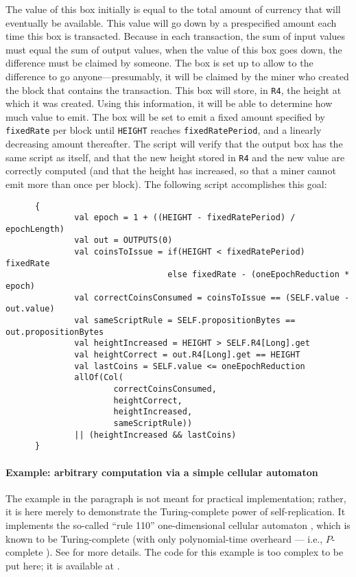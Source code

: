 \documentclass[11pt]{article}
\newcommand{\authnote}[2]{\marginpar{\parbox{\marginparwidth}{\tiny %
  \textsf{#1 {\textcolor{blue}{notes: #2}}}}}%
  \textcolor{blue}{\textbf{\dag}}}
\newcommand{\authnote}[2]{
  \textsf{#1 \textcolor{blue}{: #2}}}
\newcommand{\authnote}[2]{}
\newcommand{\lnote}[1]{{\authnote{\textcolor{orange}{Leo notes}}{#1}}}
\newcommand{\langname}{ErgoScript\xspace}
\begin{document}
The value of this box initially is equal to the total amount of currency that will eventually be available. This value will go down by a prespecified amount each time this box is transacted. Because in each transaction, the sum of input values must equal the sum of output values, when the value of this box goes down, the difference must be claimed by someone. The box is set up to allow to the difference to go anyone---presumably, it will be claimed by the miner who created the block that contains the transaction. This box will store, in \texttt{R4}, the height at which it was created. Using this information, it will be able to determine how much value to emit. The box will be set to emit 
a fixed amount specified by \texttt{fixedRate} per block until \texttt{HEIGHT} reaches \texttt{fixedRatePeriod}, and a linearly decreasing amount thereafter. The script will verify that the output box has the same script as itself, and that the new height stored in \texttt{R4} and the new value are correctly computed (and that the height has increased, so that a miner cannot emit more than once per block). The following script accomplishes this goal:
\begin{verbatim}
      {
              val epoch = 1 + ((HEIGHT - fixedRatePeriod) / epochLength)
              val out = OUTPUTS(0)
              val coinsToIssue = if(HEIGHT < fixedRatePeriod) fixedRate 
                                 else fixedRate - (oneEpochReduction * epoch)
              val correctCoinsConsumed = coinsToIssue == (SELF.value - out.value)
              val sameScriptRule = SELF.propositionBytes == out.propositionBytes
              val heightIncreased = HEIGHT > SELF.R4[Long].get
              val heightCorrect = out.R4[Long].get == HEIGHT
              val lastCoins = SELF.value <= oneEpochReduction
              allOf(Col(
                      correctCoinsConsumed, 
                      heightCorrect, 
                      heightIncreased, 
                      sameScriptRule)) 
              || (heightIncreased && lastCoins)
      }
\end{verbatim}


\lnote{Not including demurrage example because it required more explanation about checking from miners and consensus about what registers are for what}


\paragraph{Example: arbitrary computation via a simple cellular automaton}
The example in the paragraph is not meant for practical implementation; rather, it is here merely to demonstrate the Turing-complete power of self-replication. It implements the so-called ``rule 110'' one-dimensional cellular automaton \cite{wolfram1986theory}, which is known to be Turing-complete \cite{cook2004universality} (with only polynomial-time overheard --- i.e., $P$-complete \cite{NW06}). See \cite{CKM18}  for more details. The code for this example is too complex to be put here; it is available at \lnote{give a reference to the code once it is written in our \langname and is sitting online somewhere}. 
\end{document}
